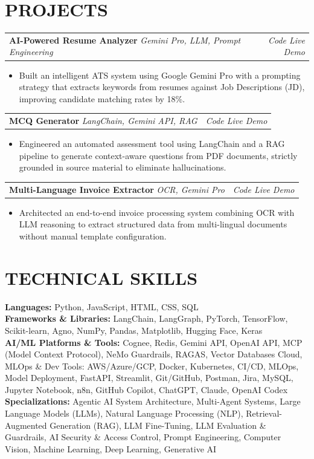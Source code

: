\documentclass[a4paper,9pt]{extarticle}
\makeatletter
\newcommand{\resumeItem}[1]{
  \item #1
}
\newcommand{\resumeProjectHeading}[2]{
  \vspace{0.5pt}
  \begin{tabular*}{1.0\textwidth}[t]{l@{\extracolsep{\fill}}r}
    #1 & \textit{\small #2}
  \end{tabular*}\vspace{-1.5pt}
}
\makeatother
\begin{document}
\section{PROJECTS}
\resumeProjectHeading
  {\textbf{AI-Powered Resume Analyzer} \enspace\textbar\enspace \emph{Gemini Pro, LLM, Prompt Engineering}}{\textit{Code} \enspace\textbar\enspace \textit{Live Demo}}
\begin{itemize}
  \resumeItem{Built an intelligent ATS system using Google Gemini Pro with a prompting strategy that extracts keywords from resumes against Job Descriptions (JD), improving candidate matching rates by 18\%.}
\end{itemize}\vspace{-3pt}
\resumeProjectHeading
  {\textbf{MCQ Generator} \enspace\textbar\enspace \emph{LangChain, Gemini API, RAG}}{\textit{Code} \enspace\textbar\enspace \textit{Live Demo}}
\begin{itemize}
  \resumeItem{Engineered an automated assessment tool using LangChain and a RAG pipeline to generate context-aware questions from PDF documents, strictly grounded in source material to eliminate hallucinations.}
\end{itemize}\vspace{-3pt}
\resumeProjectHeading
  {\textbf{Multi-Language Invoice Extractor} \enspace\textbar\enspace \emph{OCR, Gemini Pro}}{\textit{Code} \enspace\textbar\enspace \textit{Live Demo}}
\begin{itemize}
  \resumeItem{Architected an end-to-end invoice processing system combining OCR with LLM reasoning to extract structured data from multi-lingual documents without manual template configuration.}
\end{itemize}\vspace{-3pt}

\section{TECHNICAL SKILLS}
{\small \textbf{Languages:} Python, JavaScript, HTML, CSS, SQL}\\[1pt]
{\small \textbf{Frameworks \& Libraries:} LangChain, LangGraph, PyTorch, TensorFlow, Scikit-learn, Agno, NumPy, Pandas, Matplotlib, Hugging Face, Keras}\\[1pt]
{\small \textbf{AI/ML Platforms \& Tools:} Cognee, Redis, Gemini API, OpenAI API, MCP (Model Context Protocol), NeMo Guardrails, RAGAS, Vector Databases Cloud, MLOps \& Dev Tools: AWS/Azure/GCP, Docker, Kubernetes, CI/CD, MLOps, Model Deployment, FastAPI, Streamlit, Git/GitHub, Postman, Jira, MySQL, Jupyter Notebook, n8n, GitHub Copilot, ChatGPT, Claude, OpenAI Codex}\\[1pt]
{\small \textbf{Specializations:} Agentic AI System Architecture, Multi-Agent Systems, Large Language Models (LLMs), Natural Language Processing (NLP), Retrieval-Augmented Generation (RAG), LLM Fine-Tuning, LLM Evaluation \& Guardrails, AI Security \& Access Control, Prompt Engineering, Computer Vision, Machine Learning, Deep Learning, Generative AI}\\[1pt]
\end{document}
